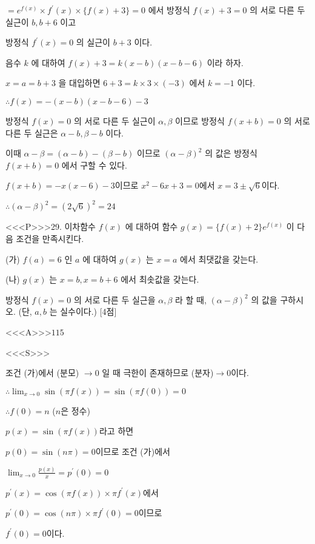 \documentclass{oblivoir}
\begin{document}
$=e^{f(x)} \times f^{\prime}(x) \times\{f(x)+3\}=0$ 에서 방정식 $f(x)+3=0$ 의 서로 다른 두 실근이 $b, b+6$ 이고

방정식 $f^{\prime}(x)=0$ 의 실근이 $b+3$ 이다.

음수 $k$ 에 대하여 $f(x)+3=k(x-b)(x-b-6)$ 이라 하자.

$x=a=b+3$ 을 대입하면 $6+3=k \times 3 \times(-3)$ 에서 $k=-1$ 이다.

$\therefore f(x)=-(x-b)(x-b-6)-3$

방정식 $f(x)=0$ 의 서로 다른 두 실근이 $\alpha, \beta$ 이므로 방정식 $f(x+b)=0$ 의 서로 다른 두 실근은 $\alpha-b, \beta-b$ 이다.

이때 $\alpha-\beta=(\alpha-b)-(\beta-b)$ 이므로 $(\alpha-\beta)^{2}$ 의 값은 방정식 $f(x+b)=0$ 에서 구할 수 있다.

$f(x+b)=-x(x-6)-3$이므로 $x^{2}-6 x+3=0$에서 $x=3 \pm \sqrt{6}$이다.

$\therefore(\alpha-\beta)^{2}=(2 \sqrt{6})^{2}=24$



<<<P>>>29. 이차함수 $f(x)$ 에 대하여 함수 $g(x)=\{f(x)+2\} e^{f(x)}$ 이 다음 조건을 만족시킨다.

(가) $f(a)=6$ 인 $a$ 에 대하여 $g(x)$ 는 $x=a$ 에서 최댓값을 갖는다.

(나) $g(x)$ 는 $x=b, x=b+6$ 에서 최솟값을 갖는다.

방정식 $f(x)=0$ 의 서로 다른 두 실근을 $\alpha, \beta$ 라 할 때, $(\alpha-\beta)^{2}$ 의 값을 구하시오. (단, $a, b$ 는 실수이다.) [4점]



<<<A>>>$115$

<<<S>>>



조건 (가)에서 (분모) $\rightarrow 0$ 일 때 극한이 존재하므로 (분자)$\rightarrow 0$이다.

$\therefore \lim _{x \rightarrow 0} \sin (\pi f(x))=\sin (\pi f(0))=0 $

$\therefore f(0)=n$ ($n$은 정수)

$p(x)=\sin (\pi f(x))$라고 하면

$p(0)=\sin (n \pi)=0$이므로 조건 (가)에서

$\lim _{x \rightarrow 0} \frac{p(x)}{x}=p^{\prime}(0)=0$

$p^{\prime}(x)=\cos (\pi f(x)) \times \pi f^{\prime}(x)$에서

$p^{\prime}(0)=\cos (n \pi) \times \pi f^{\prime}(0)=0$이므로

$f^{\prime}(0)=0$이다.
\end{document}
